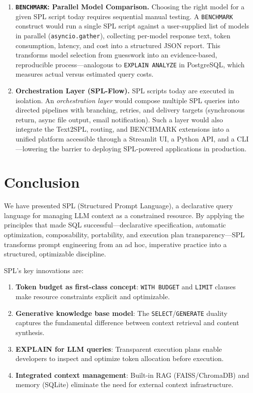 \documentclass[11pt,a4paper]{article}
\begin{document}
\begin{enumerate}
  \item \textbf{\texttt{BENCHMARK}: Parallel Model Comparison.}
  Choosing the right model for a given SPL script today requires sequential
  manual testing.  A \texttt{BENCHMARK} construct would run a single SPL script
  against a user-supplied list of models in parallel
  (\texttt{asyncio.gather}), collecting per-model response text, token
  consumption, latency, and cost into a structured JSON report.  This
  transforms model selection from guesswork into an evidence-based,
  reproducible process---analogous to \texttt{EXPLAIN ANALYZE} in PostgreSQL,
  which measures actual versus estimated query costs.

  \item \textbf{Orchestration Layer (SPL-Flow).}
  SPL scripts today are executed in isolation.  An \emph{orchestration layer}
  would compose multiple SPL queries into directed pipelines with branching,
  retries, and delivery targets (synchronous return, async file output, email
  notification).  Such a layer would also integrate the Text2SPL, routing,
  and BENCHMARK extensions into a unified platform accessible through a
  Streamlit UI, a Python API, and a CLI---lowering the barrier to deploying
  SPL-powered applications in production.

\end{enumerate}


\section{Conclusion}
\label{sec:conclusion}

We have presented SPL (Structured Prompt Language), a declarative query language for managing LLM context as a constrained resource. By applying the principles that made SQL successful---declarative specification, automatic optimization, composability, portability, and execution plan transparency---SPL transforms prompt engineering from an ad hoc, imperative practice into a structured, optimizable discipline.

SPL's key innovations are:

\begin{enumerate}[nosep]
  \item \textbf{Token budget as first-class concept}: \texttt{WITH BUDGET} and \texttt{LIMIT} clauses make resource constraints explicit and optimizable.
  \item \textbf{Generative knowledge base model}: The \texttt{SELECT}/\texttt{GENERATE} duality captures the fundamental difference between context retrieval and content synthesis.
  \item \textbf{EXPLAIN for LLM queries}: Transparent execution plans enable developers to inspect and optimize token allocation before execution.
  \item \textbf{Integrated context management}: Built-in RAG (FAISS/ChromaDB) and memory (SQLite) eliminate the need for external context infrastructure.
\end{enumerate}
\end{document}
